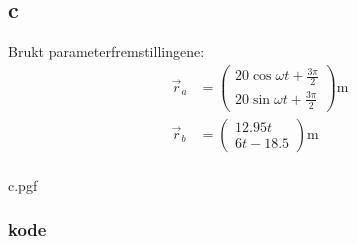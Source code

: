 \subsection{c}

Brukt parameterfremstillingene:
\begin{align}
\vec{r}_a &= 
\begin{pmatrix} 20\cos{\omega t + \frac{3 \pi}{2}} \\ 20\sin{\omega t + \frac{3 \pi}{2}} \end{pmatrix} \mathrm{m} \\[1em]
\vec{r}_b &= 
\begin{pmatrix} 12.95 t \\ 6 t - 18.5 \end{pmatrix} \mathrm{m} \\[1em]
\end{align}

{c.pgf}

\newpage

\subsubsection{kode}

